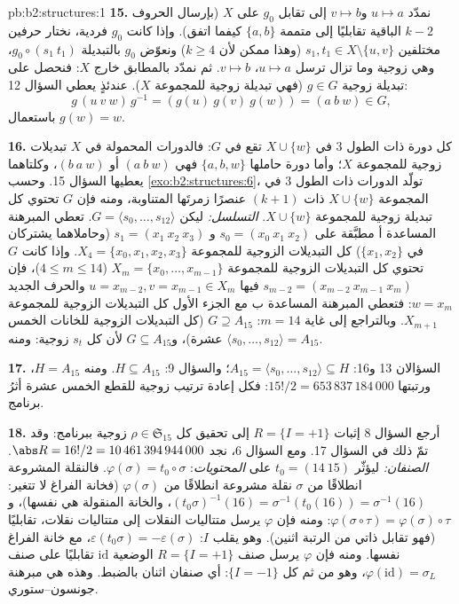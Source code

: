 \begin{solution}{pb:b2:structures:1}
\textbf{15.} نمدّد $u \mapsto a$ و$v \mapsto b$ إلى تقابل
$g_0$ على $X$ (بإرسال الحروف $k - 2$ الباقية تقابليًا
إلى متممة $\{a, b\}$ كيفما اتفق). وإذا كانت $g_0$ فردية،
نختار حرفين مختلفين $s_1, t_1 \in X \setminus \{u, v\}$
(وهذا ممكن لأن $k \geq 4$) ونعوّض $g_0$ بالتبديلة $g_0 \circ (s_1\
t_1)$، وهي زوجية وما تزال ترسل $u \mapsto a$، $v \mapsto
b$. ثم نمدّد بالمطابق خارج $X$: فنحصل على تبديلة زوجية $g \in
G$ (فهي تبديلة زوجية للمجموعة $X$). عندئذٍ يعطي السؤال 12:
\[
g\,(u\ v\ w)\,g^{-1} = (g(u)\ g(v)\ g(w)) = (a\ b\ w) \in G,
\]
باستعمال $g(w) = w$.

\textbf{16.} كل دورة ذات الطول $3$ في $X \cup \{w\}$ تقع في $G$:
فالدورات المحمولة في $X$ تبديلات زوجية للمجموعة $X$؛ وأما دورة حاملها
$\{a, b, w\}$ فهي $(a\ b\ w)$ أو $(b\ a\ w)$، وكلتاهما
يعطيها السؤال 15. وحسب \cref{exo:b2:structures:6}، تولّد
الدورات ذات الطول $3$ في المجموعة $X \cup \{w\}$ ذات $(k+1)$ عنصرًا
زمرتَها المتناوبة، ومنه فإن $G$ تحتوي كل تبديلة زوجية
للمجموعة $X \cup \{w\}$. \emph{التسلسل:} ليكن $G = \langle s_0, \dots,
s_{12}\rangle$. تعطي المبرهنة المساعدة أ مطبَّقة على $s_0 = (x_0\ x_1\ x_2)$ و
$s_1 = (x_1\ x_2\ x_3)$ (وحاملاهما يشتركان في $\{x_1, x_2\}$)
كل التبديلات الزوجية للمجموعة $X_4 = \{x_0, x_1, x_2, x_3\}$. وإذا كانت $G$
تحتوي كل التبديلات الزوجية للمجموعة $X_m = \{x_0, \dots,
x_{m-1}\}$ ($4 \leq m \leq 14$)، فإن $s_{m-2} = (x_{m-2}\
x_{m-1}\ x_m)$ فيها $u = x_{m-2}, v = x_{m-1} \in X_m$ والحرف
الجديد $w = x_m$: فتعطي المبرهنة المساعدة ب مع الجزء الأول كل التبديلات
الزوجية للمجموعة $X_{m+1}$. وبالتراجع إلى غاية $m = 14$: $G \supseteq
A_{15}$ (كل التبديلات الزوجية للخانات الخمس عشرة)، و$G
\subseteq A_{15}$ لأن كل $s_t$ زوجية: ومنه $\langle s_0, \dots,
s_{12}\rangle = A_{15}$.

\textbf{17.} السؤالان 13 و16: $A_{15} = \langle s_0, \dots,
s_{12}\rangle \subseteq H$؛ والسؤال 9: $H \subseteq A_{15}$. ومنه
$H = A_{15}$، ورتبتها $15!/2 = 653\,837\,184\,000$: فكل إعادة ترتيب
زوجية للقطع الخمس عشرة أثرُ برنامج.

\textbf{18.} أرجع السؤال 8 إثبات $R = \{I = +1\}$ إلى تحقيق
كل $\rho \in \mathfrak{S}_{15}$ زوجية ببرنامج: وقد تمّ ذلك في
السؤال 17. ومع السؤال 6، نجد $\abs R = 16!/2 =
10\,461\,394\,944\,000$. \emph{الصنفان:} ليؤثّر $t_0 = (14\
15)$ على \emph{المحتويات}: $\varphi(\sigma) = t_0 \circ
\sigma$. فالنقلة المشروعة انطلاقًا من $\sigma$ نقلة مشروعة انطلاقًا من
$\varphi(\sigma)$ (فخانة الفراغ لا تتغير:
$(t_0\sigma)^{-1}(16) = \sigma^{-1}(t_0(16)) = \sigma^{-1}(16)$،
والخانة المنقولة هي نفسها)، و$\varphi(\sigma \circ \tau)
= \varphi(\sigma) \circ \tau$: ومنه فإن $\varphi$ يرسل متتاليات النقلات إلى
متتاليات نقلات، تقابليًا (فهو تقابل ذاتي من الرتبة اثنين). وهو يقلب $I$:
$\varepsilon(t_0\sigma) = -\varepsilon(\sigma)$، مع خانة
الفراغ نفسها. ومنه فإن $\varphi$ يرسل صنف $R = \{I = +1\}$
الوضعية $\mathrm{id}$ تقابليًا على صنف $\varphi(\mathrm{id})
= \sigma_L$، وهو من ثم كل $\{I = -1\}$: أي صنفان
اثنان بالضبط. وهذه هي مبرهنة جونسون--ستوري.


\end{solution}
